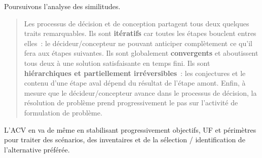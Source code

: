 Poursuivons l'analyse des similitudes.
\blockcquote[p.82]{micaelli_artificialisme:_2003}{
Les processus de décision et de conception %
partagent tous deux quelques traits remarquables.
Ils sont \textbf{itératifs} car toutes les étapes bouclent entres elles~: le décideur/concepteur ne pouvant anticiper complètement ce qu'il fera aux étapes suivantes.
Ils sont globalement \textbf{convergents} et aboutissent tous deux à une solution satisfaisante en temps fini.
Ils sont \textbf{hiérarchiques et partiellement irréversibles}~: les conjectures et le contenu d'une étape aval dépend du résultat de l'étape amont.
Enfin, à mesure que le décideur/concepteur avance dans le processus de décision, la résolution de problème prend progressivement le pas sur l'activité de formulation de problème.
}
L'\gls{ACV} en va de même en stabilisant progressivement objectifs, \gls{UF} et périmètres pour traiter des scénarios, des inventaires et de la sélection / identification de l'alternative préférée.

